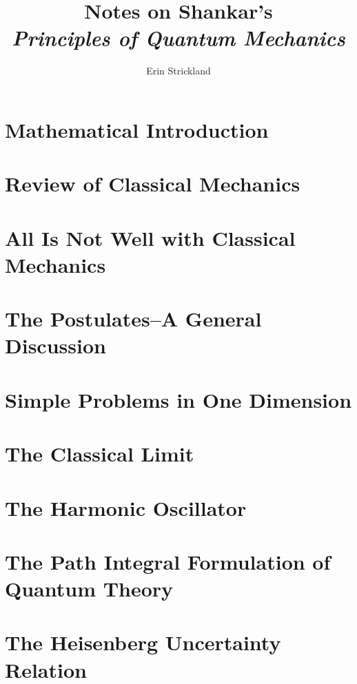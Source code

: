 \documentclass[10pt,twocolumn,leqno]{article}
\author{{Erin Strickland} \\
    \eddress{strickland.g.erin@gmail.com}}
\title{{\vspace*{-1.5in}}Notes on Shankar's \\
    \emph{Principles of Quantum Mechanics}}
\date{\vspace{-2ex}}
\theoremstyle{theorem}
\theoremstyle{example}
\theoremstyle{exercise}
\numberwithin{equation}{subsection}
\begin{document}
\maketitle

\tableofcontents

\section{Mathematical Introduction}


\section{Review of Classical Mechanics}


\section{All Is Not Well with Classical Mechanics}


\section{The Postulates--A General Discussion}


\section{Simple Problems in One Dimension}


\section{The Classical Limit}


\section{The Harmonic Oscillator}


\section{The Path Integral Formulation of Quantum Theory}


\section{The Heisenberg Uncertainty Relation}

\end{document}
